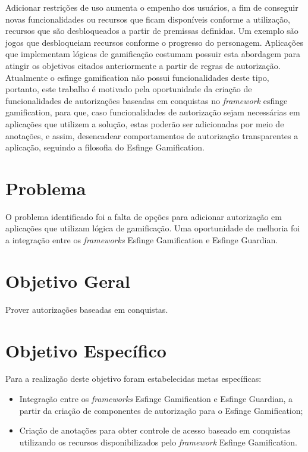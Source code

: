 \par Adicionar restrições de uso aumenta o empenho dos usuários, a fim de conseguir novas funcionalidades ou recursos que ficam disponíveis conforme a utilização, recursos que são desbloqueados a partir de premissas definidas. Um exemplo são jogos que desbloqueiam recursos conforme o progresso do personagem. Aplicações que implementam lógicas de gamificação costumam possuir esta abordagem para atingir os objetivos citados anteriormente a partir de regras de autorização. Atualmente o esfinge gamification não possui funcionalidades deste tipo, portanto, este trabalho é motivado pela oportunidade da criação de funcionalidades de autorizações baseadas em conquistas no \textit{framework} esfinge gamification, para que, caso funcionalidades de autorização sejam necessárias em aplicações que utilizem a solução, estas poderão ser adicionadas por meio de anotações, e assim, desencadear comportamentos de autorização transparentes a aplicação, seguindo a filosofia do Esfinge Gamification.

\section{Problema}

\par O problema identificado foi a falta de opções para adicionar autorização em aplicações que utilizam lógica de gamificação. Uma oportunidade de melhoria foi a integração entre os \textit{frameworks} Esfinge Gamification e Esfinge Guardian.

\section{Objetivo Geral}

\par Prover autorizações baseadas em conquistas. 

\section{Objetivo Espec\'ifico}

\par Para a realização deste objetivo foram estabelecidas metas específicas:
\begin{itemize}
    \item Integração entre os \textit{frameworks} Esfinge Gamification e Esfinge Guardian, a partir da criação de componentes de autorização para o Esfinge Gamification;
    \item Criação de anotações para obter controle de acesso baseado em conquistas utilizando os recursos disponibilizados pelo \textit{framework} Esfinge Gamification.
\end{itemize}

